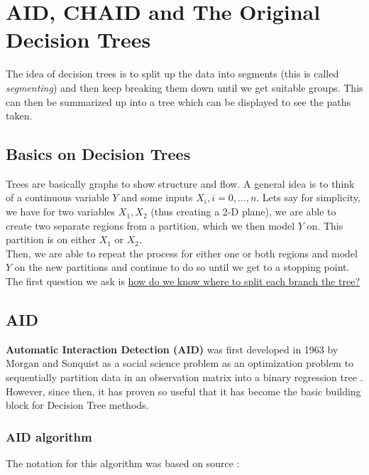 \documentclass[11pt,a4paper]{report}
\begin{document}
\chapter{AID, CHAID and The Original Decision Trees}
The idea of decision trees is to split up the data into segments (this is called \textit{segmenting}) and then keep breaking them down until we get suitable groups. This can then be summarized up into a tree which can be displayed to see the paths taken.

\section{Basics on Decision Trees}
Trees are basically graphs to show structure and flow.
A general idea is to think of a continuous variable $Y$ and some inputs $X_i ,  i = 0,...,n$. Lets say for simplicity, we have for two variables $X_1, X_2$ (thus creating a 2-D plane), we are able to create two separate regions from a partition, which we then model $Y$ on. This partition is on either $X_1$ or $X_2$. \\
Then, we are able to repeat the process for either one or both regions and model $Y$ on the new partitions and continue to do so until we get to a stopping point.
\\
The first question we ask is \underline{how do we know where to split each branch the tree?}

\section{AID}
\textbf{Automatic Interaction Detection (AID)} was first developed in 1963 by Morgan and Sonquist as a social science problem \cite{AID} as an optimization problem to sequentially partition data in an observation matrix into a binary regression tree \cite{ORAID}.
However, since then, it has proven so useful that it has become the basic building block for Decision Tree methods.

\subsection{AID algorithm}
The notation for this algorithm was based on source \cite{EarlyTree}:
\end{document}
